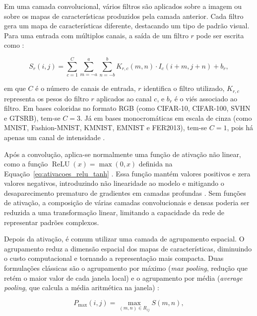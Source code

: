 \documentclass[
    12pt,
    openright,
    oneside,
    a4paper,
    english,
    brazil
]{abntex2}
\begin{document}
Em uma camada convolucional, vários filtros são aplicados sobre a imagem ou sobre os mapas de características produzidos pela camada anterior. Cada filtro gera um mapa de características diferente, destacando um tipo de padrão visual. Para uma entrada com múltiplos canais, a saída de um filtro \(r\) pode ser escrita como \cite{goodfellow2016deep,LeCun2015}:

\begin{equation}
\label{eq:convolucao_multicanal}
S_r(i,j) =
\sum_{c=1}^{C}
\sum_{m=-a}^{a}
\sum_{n=-b}^{b}
K_{r,c}(m,n)\cdot I_c(i+m,j+n) + b_r,
\end{equation}

em que \(C\) é o número de canais de entrada, \(r\) identifica o filtro utilizado, \(K_{r,c}\) representa os pesos do filtro \(r\) aplicados ao canal \(c\), e \(b_r\) é o viés associado ao filtro. Em bases coloridas no formato RGB (como CIFAR-10, CIFAR-100, SVHN e GTSRB), tem-se \(C=3\). Já em bases monocromáticas em escala de cinza (como MNIST, Fashion-MNIST, KMNIST, EMNIST e FER2013), tem-se \(C=1\), pois há apenas um canal de intensidade \cite{goodfellow2016deep,gonzalez2008digital}.

Após a convolução, aplica-se normalmente uma função de ativação não linear, como a função \(\operatorname{ReLU}(x) = \max(0,x)\) definida na Equação~\eqref{eq:ativacoes_relu_tanh} \cite{nair2010relu}. Essa função mantém valores positivos e zera valores negativos, introduzindo não linearidade ao modelo e mitigando o desaparecimento prematuro de gradientes em camadas profundas \cite{nair2010relu,goodfellow2016deep}. Sem funções de ativação, a composição de várias camadas convolucionais e densas poderia ser reduzida a uma transformação linear, limitando a capacidade da rede de representar padrões complexos.

Depois da ativação, é comum utilizar uma camada de agrupamento espacial. O agrupamento reduz a dimensão espacial dos mapas de características, diminuindo o custo computacional e tornando a representação mais compacta. Duas formulações clássicas são o agrupamento por máximo (\textit{max pooling}, redução que retém o maior valor de cada janela local) e o agrupamento por média (\textit{average pooling}, que calcula a média aritmética na janela) \cite{LeCun2015,zhao2024improvedpooling}:

\begin{equation}
\label{eq:max_pooling}
P_{\max}(i,j) =
\max_{(m,n)\in R_{ij}}
S(m,n),
\end{equation}
\end{document}
